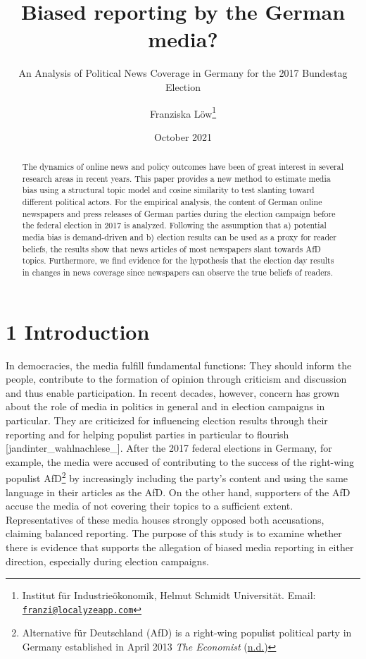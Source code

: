 \documentclass[
  12pt,
]{article}
\title{Biased reporting by the German media?}
\subtitle{An Analysis of Political News Coverage in Germany for the 2017
Bundestag Election}
\author{Franziska Löw\footnote{Institut für Industrieökonomik, Helmut
  Schmidt Universität. Email:
  \href{mailto:franzi@localyzeapp.com}{\nolinkurl{franzi@localyzeapp.com}}}}
\date{October 2021}
\begin{document}
\maketitle
\begin{abstract}
The dynamics of online news and policy outcomes have been of great
interest in several research areas in recent years. This paper provides
a new method to estimate media bias using a structural topic model and
cosine similarity to test slanting toward different political actors.
For the empirical analysis, the content of German online newspapers and
press releases of German parties during the election campaign before the
federal election in 2017 is analyzed. Following the assumption that a)
potential media bias is demand-driven and b) election results can be
used as a proxy for reader beliefs, the results show that news articles
of most newspapers slant towards AfD topics. Furthermore, we find
evidence for the hypothesis that the election day results in changes in
news coverage since newspapers can observe the true beliefs of readers.
\end{abstract}

\pagebreak
\tableofcontents
\pagebreak

\listoftables
\pagebreak

\listoffigures
\pagebreak

\hypertarget{introduction}{%
\section{1 Introduction}\label{introduction}}

In democracies, the media fulfill fundamental functions: They should
inform the people, contribute to the formation of opinion through
criticism and discussion and thus enable participation. In recent
decades, however, concern has grown about the role of media in politics
in general and in election campaigns in particular. They are criticized
for influencing election results through their reporting and for helping
populist parties in particular to flourish
{[}jandinter\_wahlnachlese\_{]}. After the 2017 federal elections in
Germany, for example, the media were accused of contributing to the
success of the right-wing populist AfD\footnote{Alternative für
  Deutschland (AfD) is a right-wing populist political party in Germany
  established in April 2013 \emph{The Economist}
  (\protect\hyperlink{ref-_germany_}{n.d.})} by increasingly including
the party's content and using the same language in their articles as the
AfD. On the other hand, supporters of the AfD accuse the media of not
covering their topics to a sufficient extent. Representatives of these
media houses strongly opposed both accusations, claiming balanced
reporting. The purpose of this study is to examine whether there is
evidence that supports the allegation of biased media reporting in
either direction, especially during election campaigns.
\end{document}
